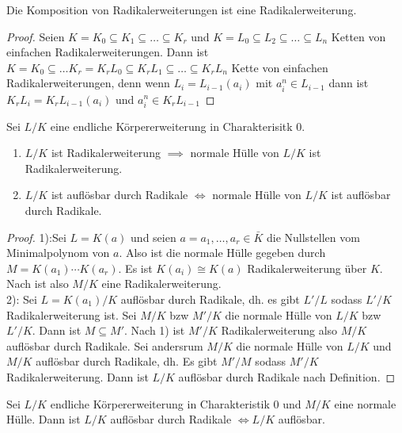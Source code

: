 \begin{Lemma}
    Die Komposition von Radikalerweiterungen ist eine Radikalerweiterung.
\end{Lemma}\label{Lem:KompRad}
\begin{proof}
    Seien \(K=K_0\subseteq K_1\subseteq \dots \subseteq K_r\) und \(K=L_0\subseteq L_2\subseteq \dots \subseteq L_n\) Ketten von einfachen Radikalerweiterungen.
    Dann ist \(K=K_0\subseteq \dots K_r=K_rL_0\subseteq K_rL_1\subseteq\dots \subseteq K_rL_n\) Kette von einfachen Radikalerweiterungen, denn wenn \(L_i=L_{i-1}(a_i)\) mit \(a_i^n\in L_{i-1}\) dann ist \(K_rL_i=K_rL_{i-1}(a_i)\) und \(a_i^n\in K_rL_{i-1}\)
\end{proof}
\begin{Lemma}\label{Lem:AuflRad}
    Sei \(L/K\) eine endliche Körpererweiterung in Charakterisitk \(0\).
    \begin{enumerate}
        \item \(L/K\) ist Radikalerweiterung \(\implies \) normale Hülle von \(L/K\) ist Radikalerweiterung.
        \item \(L/K\) ist auflösbar durch Radikale \(\iff\) normale Hülle von \(L/K\) ist auflösbar durch Radikale.
    \end{enumerate}
\end{Lemma}
\begin{proof}
    1):Sei \(L=K(a)\) und seien \(a=a_1,\dots,a_r\in\bar K\) die Nullstellen vom Minimalpolynom von \(a\). Also ist die normale Hülle gegeben durch \(M=K(a_1)\cdots K(a_r)\).
    Es ist \(K(a_i)\cong K(a)\) Radikalerweiterung über \(K\). Nach  ist also \(M/K\) eine Radikalerweiterung.\\
    2): Sei \(L=K(a_1)/K\) auflösbar durch Radikale, dh. es gibt \(L'/L\) sodass \(L'/K\) Radikalerweiterung ist. Sei \(M/K\) bzw \(M'/K\) die normale Hülle von \(L/K\) bzw \(L'/K\). Dann ist \(M\subseteq M'\). Nach 1) ist \(M'/K\) Radikalerweiterung also \(M/K\) auflösbar durch Radikale.
    Sei andersrum \(M/K\) die normale Hülle von \(L/K\) und \(M/K\) auflösbar durch Radikale, dh. Es gibt \(M'/M\) sodass \(M'/K\) Radikalerweiterung. Dann ist \(L/K\) auflösbar durch Radikale nach Definition.
\end{proof}
\begin{Satz}
    Sei \(L/K\) endliche Körpererweiterung in Charakteristik \(0\) und \(M/K\) eine normale Hülle. Dann ist \(L/K\) auflösbar durch Radikale \(\iff L/K\) auflösbar.
\end{Satz}
